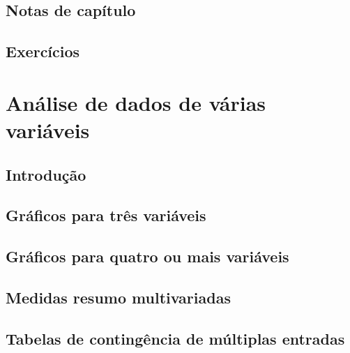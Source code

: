 \documentclass[
]{latex/krantz}
\theoremstyle{definition}
\theoremstyle{definition}
\theoremstyle{definition}
\theoremstyle{definition}
\theoremstyle{remark}
\begin{document}
\hypertarget{notas-de-capuxedtulo-2}{%
\section{Notas de capítulo}\label{notas-de-capuxedtulo-2}}

\hypertarget{exercuxedcios-2}{%
\section{Exercícios}\label{exercuxedcios-2}}

\hypertarget{anuxe1lise-de-dados-de-vuxe1rias-variuxe1veis}{%
\chapter{Análise de dados de várias variáveis}\label{anuxe1lise-de-dados-de-vuxe1rias-variuxe1veis}}

\hypertarget{introduuxe7uxe3o-3}{%
\section{Introdução}\label{introduuxe7uxe3o-3}}

\hypertarget{gruxe1ficos-para-truxeas-variuxe1veis}{%
\section{Gráficos para três variáveis}\label{gruxe1ficos-para-truxeas-variuxe1veis}}

\hypertarget{gruxe1ficos-para-quatro-ou-mais-variuxe1veis}{%
\section{Gráficos para quatro ou mais variáveis}\label{gruxe1ficos-para-quatro-ou-mais-variuxe1veis}}

\hypertarget{medidas-resumo-multivariadas}{%
\section{Medidas resumo multivariadas}\label{medidas-resumo-multivariadas}}

\hypertarget{tabelas-de-continguxeancia-de-muxfaltiplas-entradas}{%
\section{Tabelas de contingência de múltiplas entradas}\label{tabelas-de-continguxeancia-de-muxfaltiplas-entradas}}
\end{document}
